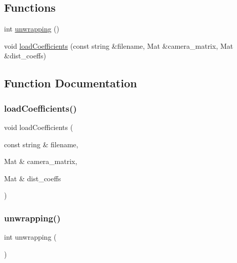 \subsection*{Functions}
\begin{DoxyCompactItemize}
\item 
int \mbox{\hyperlink{unwrapping_8hh_ae232c3264987d57a223a39226929da29}{unwrapping}} ()
\item 
void \mbox{\hyperlink{unwrapping_8hh_a045e988efa221382f1d702a6f906e682}{load\+Coefficients}} (const string \&filename, Mat \&camera\+\_\+matrix, Mat \&dist\+\_\+coeffs)
\end{DoxyCompactItemize}


\subsection{Function Documentation}
\mbox{\label{unwrapping_8hh_a045e988efa221382f1d702a6f906e682}} 
\subsubsection{\texorpdfstring{load\+Coefficients()}{loadCoefficients()}}
{\footnotesize\ttfamily void load\+Coefficients (\begin{DoxyParamCaption}\item[{const string \&}]{filename,  }\item[{Mat \&}]{camera\+\_\+matrix,  }\item[{Mat \&}]{dist\+\_\+coeffs }\end{DoxyParamCaption})}

\mbox{\label{unwrapping_8hh_ae232c3264987d57a223a39226929da29}} 
\subsubsection{\texorpdfstring{unwrapping()}{unwrapping()}}
{\footnotesize\ttfamily int unwrapping (\begin{DoxyParamCaption}{ }\end{DoxyParamCaption})}

